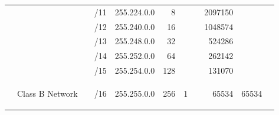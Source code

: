 \documentclass[11pt,a4paper]{article}
\begin{document}
\begin{table}[p!]
\begin{tabular}{ccccl|r|r|r|r|r|r|}
                                                       & \multicolumn{1}{c|}{}                                  & \multicolumn{1}{c|}{}                                  & \multicolumn{1}{c|}{/11} & 255.224.0.0                  & 8                            &                              &                              & 2097150                      &                              &                              \\ \cline{4-11} 
                                                       & \multicolumn{1}{c|}{}                                  & \multicolumn{1}{c|}{}                                  & \multicolumn{1}{c|}{/12} & 255.240.0.0                  & 16                           &                              &                              & 1048574                      &                              &                              \\ \cline{4-11} 
                                                       & \multicolumn{1}{c|}{}                                  & \multicolumn{1}{c|}{}                                  & \multicolumn{1}{c|}{/13} & 255.248.0.0                  & 32                           &                              &                              & 524286                       &                              &                              \\ \cline{4-11} 
                                                       & \multicolumn{1}{c|}{}                                  & \multicolumn{1}{c|}{}                                  & \multicolumn{1}{c|}{/14} & 255.252.0.0                  & 64                           &                              &                              & 262142                       &                              &                              \\ \cline{4-11} 
                                                       & \multicolumn{1}{c|}{}                                  & \multicolumn{1}{c|}{}                                  & \multicolumn{1}{c|}{/15} & 255.254.0.0                  & 128                          &                              &                              & 131070                       &                              &                              \\ \cline{2-2} \cline{4-11} 
\multicolumn{1}{c|}{}                                  & \multicolumn{1}{c|}{\multirow{15}{*}{\begin{sideways}Class B Network\end{sideways}}} & \multicolumn{1}{c|}{}                                  & \multicolumn{1}{c|}{/16} & 255.255.0.0                  & 256                          & 1                            &                              & 65534                        & 65534                        &                              \\ \cline{4-11} 

\end{tabular}
\end{table}
\end{document}
